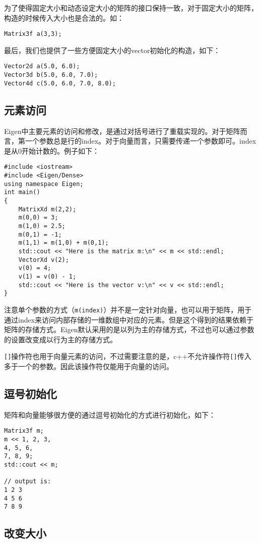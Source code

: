 为了使得固定大小和动态设定大小的矩阵的接口保持一致，对于固定大小的矩阵，构造的时候传入大小也是合法的。如：

\verb|Matrix3f a(3,3);|

最后，我们也提供了一些方便固定大小的vector初始化的构造，如下：

\begin{lstlisting}[style=Cpp]
Vector2d a(5.0, 6.0);
Vector3d b(5.0, 6.0, 7.0);
Vector4d c(5.0, 6.0, 7.0, 8.0);
\end{lstlisting}

\subsection{元素访问}
Eigen中主要元素的访问和修改，是通过对括号进行了重载实现的。对于矩阵而言，第一个参数总是行的index。对于向量而言，只需要传递一个参数即可。index是从0开始计数的。例子如下：

\begin{lstlisting}[style=Cpp]
#include <iostream>
#include <Eigen/Dense>
using namespace Eigen;
int main()
{
	MatrixXd m(2,2);
	m(0,0) = 3;
	m(1,0) = 2.5;
	m(0,1) = -1;
	m(1,1) = m(1,0) + m(0,1);
	std::cout << "Here is the matrix m:\n" << m << std::endl;
	VectorXd v(2);
	v(0) = 4;
	v(1) = v(0) - 1;
	std::cout << "Here is the vector v:\n" << v << std::endl;
}
\end{lstlisting}
注意单个参数的方式（\verb|m(index)|）并不是一定针对向量，也可以用于矩阵，用于通过index来访问内部存储的一维数组中对应的元素。但是这个得到的结果依赖于矩阵的存储方式。Eigen默认采用的是以列为主的存储方式，不过也可以通过参数的设置改变成以行为主的存储方式。

\verb|[]|操作符也用于向量元素的访问，不过需要注意的是，c++不允许操作符\verb|[]|传入多于一个的参数。因此该操作符仅能用于向量的访问。

\subsection{逗号初始化}
矩阵和向量能够很方便的通过逗号初始化的方式进行初始化，如下：
\begin{lstlisting}[style=Cpp]
Matrix3f m;
m << 1, 2, 3,
4, 5, 6,
7, 8, 9;
std::cout << m;

// output is:
1 2 3
4 5 6
7 8 9
\end{lstlisting}

\subsection{改变大小}

